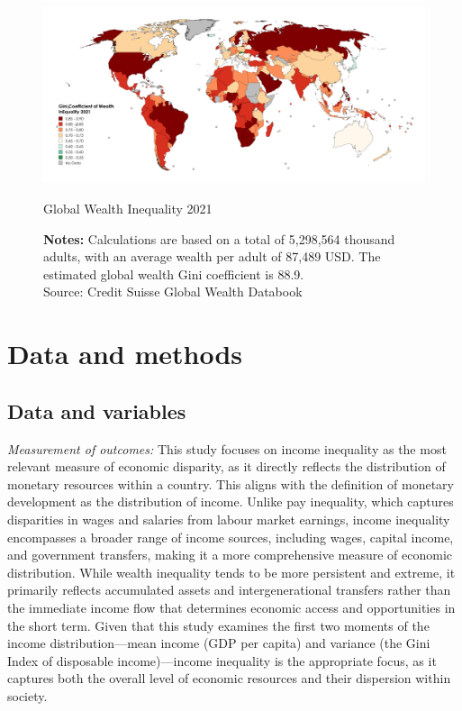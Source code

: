 \begin{figure}[h!]
\centering
\includegraphics[width=1\linewidth]{figs/global_wealth_distribution.png}
\caption{Global Wealth Inequality 2021}
\captionsetup{font=footnotesize}
\caption*{\textbf{Notes:} Calculations are based on a total of 5,298,564 thousand adults, with an average wealth per adult of 87,489 USD. The estimated global wealth Gini coefficient is 88.9.\\
Source: Credit Suisse Global Wealth Databook \parencite*{suisse2022global}}
\end{figure}

\section{Data and methods}

\subsection{Data and variables} \label{sec:data}

\textit{Measurement of outcomes:} This study focuses on income inequality as the most relevant measure of economic disparity, as it directly reflects the distribution of monetary resources within a country. This aligns with the definition of monetary development as the distribution of income. Unlike pay inequality, which captures disparities in wages and salaries from labour market earnings, income inequality encompasses a broader range of income sources, including wages, capital income, and government transfers, making it a more comprehensive measure of economic distribution. While wealth inequality tends to be more persistent and extreme, it primarily reflects accumulated assets and intergenerational transfers rather than the immediate income flow that determines economic access and opportunities in the short term. Given that this study examines the first two moments of the income distribution—mean income (GDP per capita) and variance (the Gini Index of disposable income)—income inequality is the appropriate focus, as it captures both the overall level of economic resources and their dispersion within society.  

